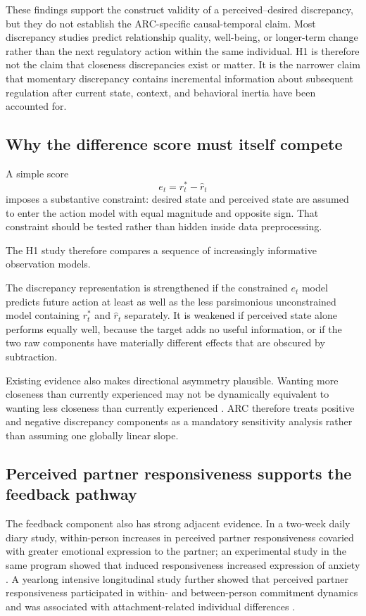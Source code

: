 These findings support the construct validity of a perceived--desired discrepancy, but they do not establish the ARC-specific causal-temporal claim. Most discrepancy studies predict relationship quality, well-being, or longer-term change rather than the next regulatory action within the same individual. H1 is therefore not the claim that closeness discrepancies exist or matter. It is the narrower claim that momentary discrepancy contains incremental information about subsequent regulation after current state, context, and behavioral inertia have been accounted for.

\subsection{Why the difference score must itself compete}

A simple score
\[
e_t=r^\ast_t-\hat r_t
\]
imposes a substantive constraint: desired state and perceived state are assumed to enter the action model with equal magnitude and opposite sign. That constraint should be tested rather than hidden inside data preprocessing.

The H1 study therefore compares a sequence of increasingly informative observation models.



The discrepancy representation is strengthened if the constrained \(e_t\) model predicts future action at least as well as the less parsimonious unconstrained model containing \(r^\ast_t\) and \(\hat r_t\) separately. It is weakened if perceived state alone performs equally well, because the target adds no useful information, or if the two raw components have materially different effects that are obscured by subtraction.

Existing evidence also makes directional asymmetry plausible. Wanting more closeness than currently experienced may not be dynamically equivalent to wanting less closeness than currently experienced \parencite{pusch2022closeness,pietras2024closeness}. ARC therefore treats positive and negative discrepancy components as a mandatory sensitivity analysis rather than assuming one globally linear slope.

\subsection{Perceived partner responsiveness supports the feedback pathway}

The feedback component also has strong adjacent evidence. In a two-week daily diary study, within-person increases in perceived partner responsiveness covaried with greater emotional expression to the partner; an experimental study in the same program showed that induced responsiveness increased expression of anxiety \parencite{ruan2020responsiveness}. A yearlong intensive longitudinal study further showed that perceived partner responsiveness participated in within- and between-person commitment dynamics and was associated with attachment-related individual differences \parencite{segal2016responsiveness}.

